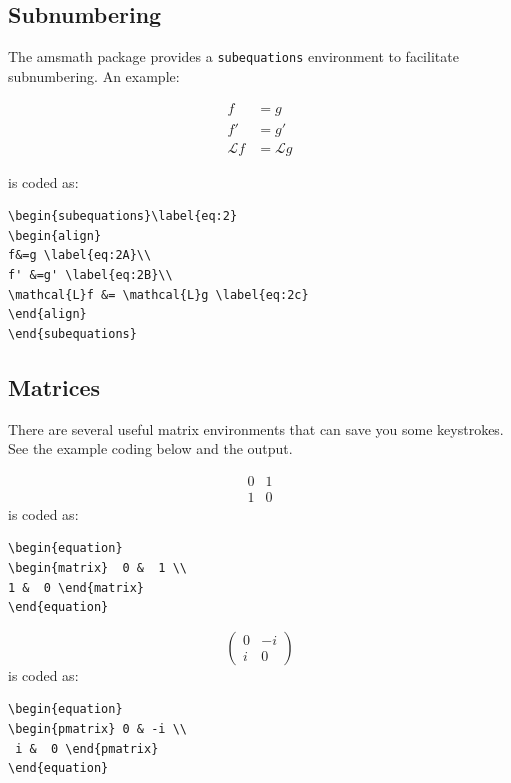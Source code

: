 \subsection{Subnumbering}
The amsmath package provides a {\tt{subequations}} environment to facilitate subnumbering. An example:

\begin{subequations}\label{eq:2}
\begin{align}
f&=g \label{eq:2A}\\
f' &=g' \label{eq:2B}\\
\mathcal{L}f &= \mathcal{L}g \label{eq:2c}
\end{align}
\end{subequations}

\noindent is coded as:
\begin{verbatim}
\begin{subequations}\label{eq:2}
\begin{align}
f&=g \label{eq:2A}\\
f' &=g' \label{eq:2B}\\
\mathcal{L}f &= \mathcal{L}g \label{eq:2c}
\end{align}
\end{subequations}

\end{verbatim}

\subsection{Matrices}
There are several useful matrix environments that can save you some keystrokes. See the example coding below and the output.

\begin{equation}
\begin{matrix}  0 &  1 \\ 
1 &  0 \end{matrix}
\end{equation}
is coded as:
\begin{verbatim}
\begin{equation}
\begin{matrix}  0 &  1 \\ 
1 &  0 \end{matrix}
\end{equation}
\end{verbatim}

\begin{equation}
\begin{pmatrix} 0 & -i \\
 i &  0 \end{pmatrix}
\end{equation}
is coded as:
\begin{verbatim}
\begin{equation}
\begin{pmatrix} 0 & -i \\
 i &  0 \end{pmatrix}
\end{equation}
\end{verbatim}

